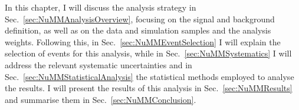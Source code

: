 



In this chapter, I will discuss the analysis strategy in Sec.~\ref{sec:NuMMAnalysisOverview}, focusing on the signal and background definition, as well as on the data and simulation samples and the analysis weights. Following this, in Sec.~\ref{sec:NuMMEventSelection} I will explain the selection of events for this analysis, while in Sec.~\ref{sec:NuMMSystematics} I will address the relevant systematic uncertainties and in Sec.~\ref{sec:NuMMStatisticalAnalysis} the statistical methods employed to analyse the results. I will present the results of this analysis in Sec.~\ref{sec:NuMMResults} and summarise them in Sec.~\ref{sec:NuMMConclusion}.

\iffalse
